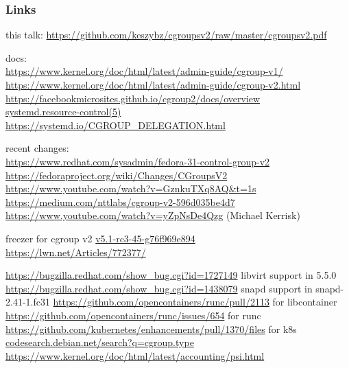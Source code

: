 \documentclass[serif]{beamer}
\begin{document}
\begin{frame}[fragile]
  \frametitle{Links}
  \tiny

  this talk: \url{https://github.com/keszybz/cgroupsv2/raw/master/cgroupsv2.pdf}

  \medskip

  docs:\\
  \url{https://www.kernel.org/doc/html/latest/admin-guide/cgroup-v1/}\\
  \url{https://www.kernel.org/doc/html/latest/admin-guide/cgroup-v2.html}\\
  \url{https://facebookmicrosites.github.io/cgroup2/docs/overview}\\
  \href{https://www.freedesktop.org/software/systemd/man/systemd.resource-control.html}{systemd.resource-control(5)}\\
  \url{https://systemd.io/CGROUP_DELEGATION.html}

  \medskip

  recent changes: \\
  \url{https://www.redhat.com/sysadmin/fedora-31-control-group-v2}\\
  \url{https://fedoraproject.org/wiki/Changes/CGroupsV2}\\
  \url{https://www.youtube.com/watch?v=GznkuTXq8AQ&t=1s}\\
  \url{https://medium.com/nttlabs/cgroup-v2-596d035be4d7}\\
  \url{https://www.youtube.com/watch?v=yZpNsDe4Qzg} (Michael Kerrisk)

  freezer for cgroup v2 \href{https://git.kernel.org/pub/scm/linux/kernel/git/torvalds/linux.git/commit/v5.1-rc3-45-g76f969e894}{v5.1-rc3-45-g76f969e894}\\
  \url{https://lwn.net/Articles/772377/}

  \url{https://bugzilla.redhat.com/show_bug.cgi?id=1727149} libvirt support in 5.5.0
  \url{https://bugzilla.redhat.com/show_bug.cgi?id=1438079} snapd support in snapd-2.41-1.fc31
  \url{https://github.com/opencontainers/runc/pull/2113} for libcontainer
  \url{https://github.com/opencontainers/runc/issues/654} for runc
  \url{https://github.com/kubernetes/enhancements/pull/1370/files} for k8s
  \href{https://codesearch.debian.net/search?q=cgroup.type&literal=1&perpkg=1}{codesearch.debian.net/search?q=cgroup.type}
  \url{https://www.kernel.org/doc/html/latest/accounting/psi.html}
\end{frame}
\end{document}
